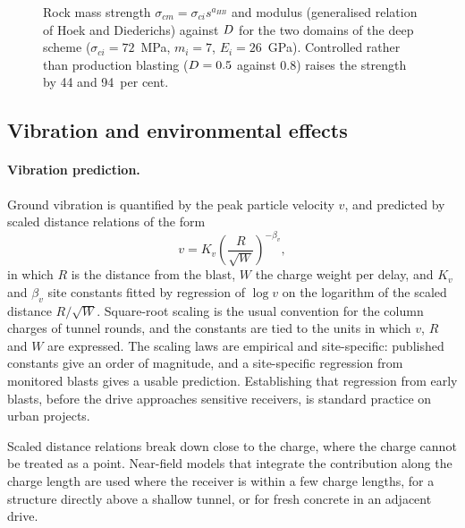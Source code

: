 \begin{figure}[htbp]
\centering
{}
\caption{Rock mass strength $\sigma_{cm} = \sigma_{ci} s^{a_{HB}}$ and modulus (generalised relation of Hoek and Diederichs) against $D$ for the two domains of the deep scheme ($\sigma_{ci} = 72$~MPa, $m_i = 7$, $E_i = 26$~GPa). Controlled rather than production blasting ($D = 0.5$ against 0.8) raises the strength by 44 and 94~per cent.}
\label{fig:disturbance-strength}
\end{figure}

\subsection{Vibration and environmental effects}
\label{sec:vibration-environment}

\paragraph{Vibration prediction.}
Ground vibration is quantified by the peak particle velocity $v$, and
predicted by scaled distance relations of the form
\[
v = K_v \left(\frac{R}{\sqrt{W}}\right)^{-\beta_v} ,
\]
in which $R$ is the distance from the blast, $W$ the charge weight per delay,
and $K_v$ and $\beta_v$ site constants fitted by regression of $\log v$ on
the logarithm of the scaled distance $R/\sqrt{W}$. Square-root scaling is
the usual convention for the column charges of tunnel rounds, and the
constants are tied to the units in which $v$, $R$ and $W$ are expressed. The
scaling laws are empirical and
site-specific: published constants give an order of magnitude, and a
site-specific regression from monitored blasts gives a usable prediction.
Establishing that regression from early blasts, before the drive approaches
sensitive receivers, is standard practice on urban projects.

Scaled distance relations break down close to the charge, where the charge
cannot be treated as a point. Near-field models that integrate the
contribution along the charge length are used where the receiver is within a
few charge lengths, for a structure directly above a shallow tunnel, or for
fresh concrete in an adjacent drive.

